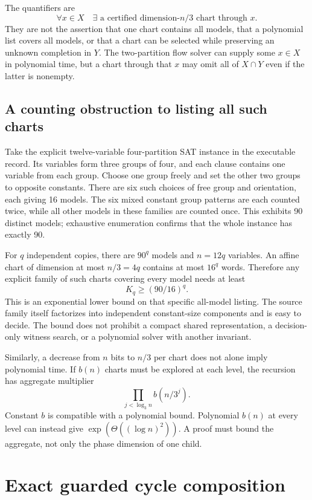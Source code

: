 \documentclass[11pt,letterpaper]{article}
\theoremstyle{definition}
\begin{document}
The quantifiers are
\[
\forall x\in X\quad \exists\text{ a certified dimension-}n/3\text{ chart through }x.
\]
They are not the assertion that one chart contains all models, that a polynomial list covers all models, or that a chart can be selected while preserving an unknown completion in $Y$. The two-partition flow solver can supply some $x\in X$ in polynomial time, but a chart through that $x$ may omit all of $X\cap Y$ even if the latter is nonempty.

\subsection{A counting obstruction to listing all such charts}

Take the explicit twelve-variable four-partition SAT instance in the executable record. Its variables form three groups of four, and each clause contains one variable from each group. Choose one group freely and set the other two groups to opposite constants. There are six such choices of free group and orientation, each giving 16 models. The six mixed constant group patterns are each counted twice, while all other models in these families are counted once. This exhibits 90 distinct models; exhaustive enumeration confirms that the whole instance has exactly 90.

For $q$ independent copies, there are $90^q$ models and $n=12q$ variables. An affine chart of dimension at most $n/3=4q$ contains at most $16^q$ words. Therefore any explicit family of such charts covering every model needs at least
\[
K_q\ge(90/16)^q.
\]
This is an exponential lower bound on that specific all-model listing. The source family itself factorizes into independent constant-size components and is easy to decide. The bound does not prohibit a compact shared representation, a decision-only witness search, or a polynomial solver with another invariant.

Similarly, a decrease from $n$ bits to $n/3$ per chart does not alone imply polynomial time. If $b(n)$ charts must be explored at each level, the recursion has aggregate multiplier
\[
\prod_{j<\log_3 n} b(n/3^j).
\]
Constant $b$ is compatible with a polynomial bound. Polynomial $b(n)$ at every level can instead give $\exp(\Theta((\log n)^2))$. A proof must bound the aggregate, not only the phase dimension of one child.

\section{Exact guarded cycle composition}
\end{document}
